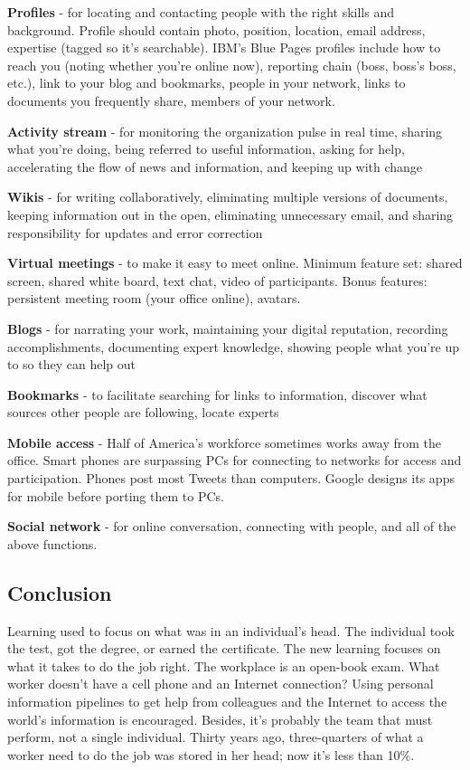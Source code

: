 \textbf{Profiles} - for locating and contacting people with the right
skills and background. Profile should contain photo, position, location,
email address, expertise (tagged so it's searchable). IBM's Blue Pages
profiles include how to reach you (noting whether you're online now),
reporting chain (boss, boss's boss, etc.), link to your blog and
bookmarks, people in your network, links to documents you frequently
share, members of your network.

\textbf{Activity stream} - for monitoring the organization pulse in real
time, sharing what you're doing, being referred to useful information,
asking for help, accelerating the flow of news and information, and
keeping up with change

\textbf{Wikis} - for writing collaboratively, eliminating multiple
versions of documents, keeping information out in the open, eliminating
unnecessary email, and sharing responsibility for updates and error
correction

\textbf{Virtual meetings} - to make it easy to meet online. Minimum
feature set: shared screen, shared white board, text chat, video of
participants. Bonus features: persistent meeting room (your office
online), avatars.

\textbf{Blogs} - for narrating your work, maintaining your digital
reputation, recording accomplishments, documenting expert knowledge,
showing people what you're up to so they can help out

\textbf{Bookmarks} - to facilitate searching for links to information,
discover what sources other people are following, locate experts

\textbf{Mobile access} - Half of America's workforce sometimes works
away from the office. Smart phones are surpassing PCs for connecting to
networks for access and participation. Phones post most Tweets than
computers. Google designs its apps for mobile before porting them to
PCs.

\textbf{Social network} - for online conversation, connecting with
people, and all of the above functions.

\subsection{Conclusion}

Learning used to focus on what was in an individual's head. The
individual took the test, got the degree, or earned the certificate. The
new learning focuses on what it takes to do the job right. The workplace
is an open-book exam. What worker doesn't have a cell phone and an
Internet connection? Using personal information pipelines to get help
from colleagues and the Internet to access the world's information is
encouraged. Besides, it's probably the team that must perform, not a
single individual. Thirty years ago, three-quarters of what a worker
need to do the job was stored in her head; now it's less than 10\%.
